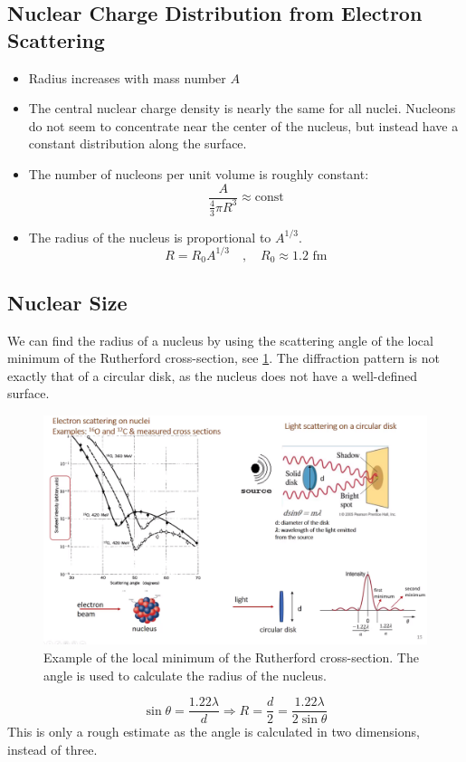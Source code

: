 \documentclass{article}
\begin{document}
\subsection{Nuclear Charge Distribution from Electron Scattering}\label{subsec: Nuclear Charge Distribution from Electron Scattering}
\begin{itemize}
    \item Radius increases with mass number $A$
    \item The central nuclear charge density is nearly the same for all nuclei. Nucleons do not seem to concentrate near the center of the nucleus, but instead have a constant distribution along the surface. 
    \item The number of nucleons per unit volume is roughly constant:
    \begin{equation}
    \frac{A}{\frac{4}{3}πR^3} ≈ \text{const}
    \end{equation} 
    \item The radius of the nucleus is proportional to $A^{1/3}$. 
    \begin{equation}
    R = R_0A^{1/3} \quad , \quad  R_0 ≈ 1.2 \text{ fm}
    \end{equation}
\end{itemize}

\subsection{Nuclear Size}
We can find the radius of a nucleus by using the scattering angle of the local minimum of the Rutherford cross-section, see \cref{fig: electron_scattering_angles}. The diffraction pattern is not exactly that of a circular disk, as the nucleus does not have a well-defined surface.
\begin{figure}[ht!]
\centering
\includegraphics[width = \textwidth]{electron_scattering_angles.png}
\caption{Example of the local minimum of the Rutherford cross-section. The angle is used to calculate the radius of the nucleus.}
\label{fig: electron_scattering_angles}
\end{figure}
\begin{equation}
\sin θ = \frac{1.22λ}{d} ⇒ R = \frac{d}{2} = \frac{1.22λ}{2\sin θ}
\end{equation}
This is only a rough estimate as the angle is calculated in two dimensions, instead of three. 
\end{document}
